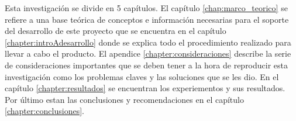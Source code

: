 


Esta investigaci\'on se divide en 5 cap\'itulos. El cap\'itulo \ref{chap:marco_teorico} se refiere a una base te\'orica de conceptos e informaci\'on necesarias para el soporte del desarrollo de este proyecto que se encuentra en el cap\'itulo  \ref{chapter:introAdesarrollo} donde se explica todo el procedimiento realizado para llevar a cabo el producto. El apendice \ref{chapter:consideraciones} describe la serie de consideraciones importantes que se deben tener a la hora de reproducir esta investigaci\'on como los problemas claves y las soluciones que se les dio. En el cap\'itulo \ref{chapter:resultados} se encuentran  los experiementos y sus resultados. Por \'ultimo estan las conclusiones y recomendaciones en el capítulo \ref{chapter:conclusiones}. 
